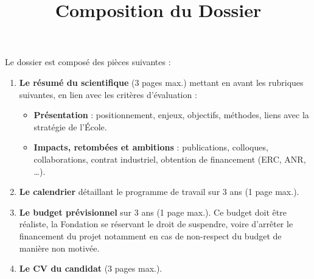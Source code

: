 \documentclass{article}
\begin{document}
\title{Composition du Dossier}
\author{}
\date{}
\maketitle

Le dossier est composé des pièces suivantes :

\begin{enumerate}
    \item \textbf{Le résumé du scientifique} (3 pages max.) mettant en avant les rubriques suivantes, en lien avec les critères d’évaluation :
    \begin{itemize}
        \item \textbf{Présentation} : positionnement, enjeux, objectifs, méthodes, liens avec la stratégie de l’École.
        \item \textbf{Impacts, retombées et ambitions} : publications, colloques, collaborations, contrat industriel, obtention de financement (ERC, ANR, …).
    \end{itemize}
    
    \item \textbf{Le calendrier} détaillant le programme de travail sur 3 ans (1 page max.).
    
    \item \textbf{Le budget prévisionnel} sur 3 ans (1 page max.). Ce budget doit être réaliste, la Fondation se réservant le droit de suspendre, voire d’arrêter le financement du projet notamment en cas de non-respect du budget de manière non motivée.
    
    \item \textbf{Le CV du candidat} (3 pages max.).
\end{enumerate}
\end{document}
